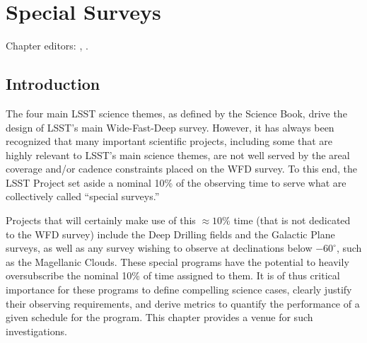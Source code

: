 \chapter[Special Surveys]{Special Surveys}
\def\chpname{specialsurveys}\label{chp:\chpname}

Chapter editors:
,
.



%


\section{Introduction}
\label{sec:specials:intro}

The four main LSST science themes, as defined by the Science Book,
drive the design of LSST's main Wide-Fast-Deep survey.  However, it
has always been recognized that many important scientific projects,
including some that are highly relevant to LSST's main science themes,
are not well served by the areal coverage and/or cadence constraints
placed on the WFD survey.  To this end, the LSST Project set aside a
nominal 10\% of the observing time to serve what are collectively
called ``special surveys.''

Projects that
will certainly make use of this $\approx10\%$ time (that is not dedicated to the WFD
survey) include the Deep Drilling fields and the Galactic Plane surveys,
as well as any survey wishing to
observe at declinations below $-60^\circ$, such as the Magellanic
Clouds.  These special programs have the potential to
heavily oversubscribe the nominal 10\%
of time assigned to them.  It is of thus critical importance for these
programs to define compelling science cases, clearly justify their
observing requirements, and derive metrics to quantify the performance
of a given schedule for the program. This chapter provides a venue for
such investigations.

